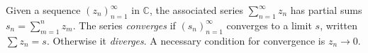 Given a sequence $(z_n)_{n=1}^{\infty}$ in $\mathbb{C}$, the associated series $\sum_{n=1}^{\infty} z_n$ has partial sums $s_n = \sum_{m=1}^{n} z_m$. The series \textit{converges} if $(s_n)_{n=1}^{\infty}$ converges to a limit $s$, written $\sum z_n = s$. Otherwise it \textit{diverges}. A necessary condition for convergence is $z_n \to 0$.
